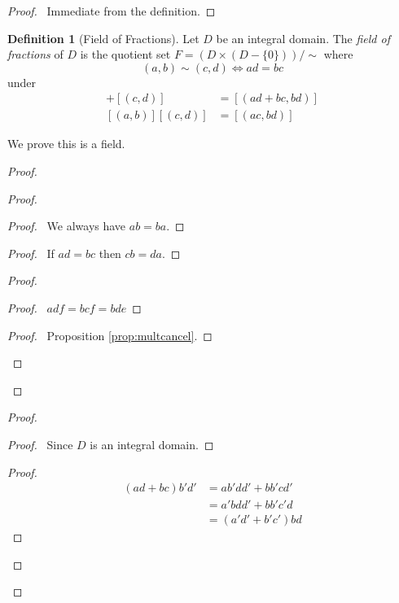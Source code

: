 \documentclass{book}
\let\qed\relax
\theoremstyle{definition}
\newtheorem{df}[ax]{Definition}
\begin{document}
\begin{proof}
\pf\ Immediate from the definition. \qed
\end{proof}

\begin{df}[Field of Fractions]
Let $D$ be an integral domain. The \emph{field of fractions} of $D$ is the quotient set $F = (D \times (D - \{0\})) / \sim$ where
\[ (a,b) \sim (c,d) \Leftrightarrow ad = bc \]
under
\begin{align*}
[(a,b)] + [(c,d)] & = [(ad+bc,bd)] \\
[(a,b)][(c,d)] & = [(ac,bd)]
\end{align*}

We prove this is a field.
\end{df}

\begin{proof}
\pf
{}
\begin{proof}
\pf
{}
\begin{proof}
	\pf\ We always have $ab = ba$.
\end{proof}
\begin{proof}
	\pf\ If $ad = bc$ then $cb = da$.
\end{proof}
\begin{proof}
	\begin{proof}
		\pf\ $adf = bcf = bde$
	\end{proof}
	\begin{proof}
		\pf\ Proposition \ref{prop:multcancel}.
	\end{proof}
\end{proof}
\qed
\end{proof}
\begin{proof}
\pf
{}
\begin{proof}
	\pf\ Since $D$ is an integral domain.
\end{proof}
\begin{proof}
	\pf
	\begin{align*}
		(ad+bc)b'd' & = ab'dd' + bb'cd' \\
		& = a'bdd' + bb'c'd \\
		& = (a'd' + b'c')bd

\end{align*}
\end{proof}
\end{proof}
\end{proof}
\end{document}

